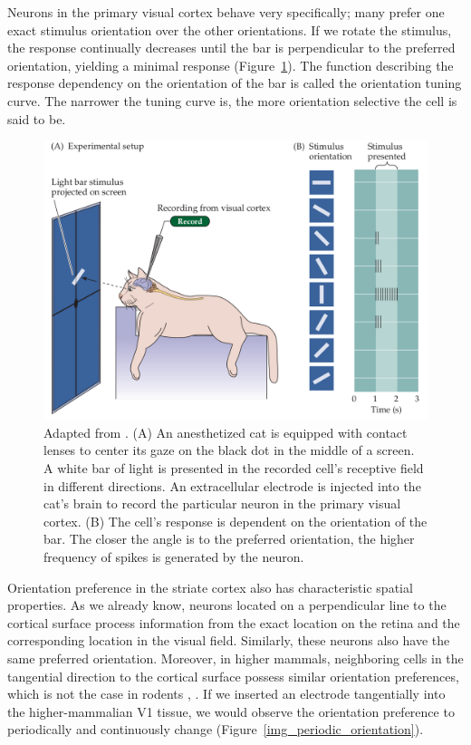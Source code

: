 Neurons in the primary visual cortex behave very specifically; many prefer one exact stimulus orientation over the other orientations. If we rotate the stimulus, the response continually decreases until the bar is perpendicular to the preferred orientation, yielding a minimal response (Figure~\ref{img_cat_experiment}). The function describing the response dependency on the orientation of the bar is called the orientation tuning curve. The narrower the tuning curve is, the more orientation selective the cell is said to be.

\begin{figure}[H]\centering
	\includegraphics[width=140mm]{../img/cat_experiment.png}
	\caption{Adapted from \citep{purves_2019}.
		(A) An anesthetized cat is equipped with contact lenses to center its gaze on the black dot in the middle of a screen. A white bar of light is presented in the recorded cell’s receptive field in different directions. An extracellular electrode is injected into the cat’s brain to record the particular neuron in the primary visual cortex.
		(B) The cell’s response is dependent on the orientation of the bar. The closer the angle is to the preferred orientation, the higher frequency of spikes is generated by the neuron. 
	}
	\label{img_cat_experiment}
\end{figure}

Orientation preference in the striate cortex also has characteristic spatial properties. As we already know, neurons located on a perpendicular line to the cortical surface process information from the exact location on the retina and the corresponding location in the visual field. Similarly, these neurons also have the same preferred orientation. Moreover, in higher mammals, neighboring cells in the tangential direction to the cortical surface possess similar orientation preferences, which is not the case in rodents \citep{van2005orientation}, \citep{bednar2016cortical}. If we inserted an electrode tangentially into the higher-mammalian V1 tissue, we would observe the orientation preference to periodically and continuously change (Figure~\ref{img_periodic_orientation}).


